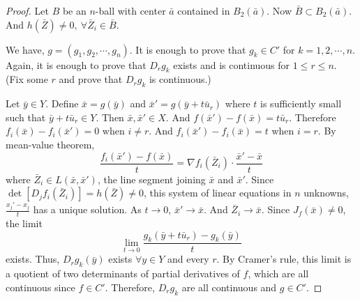 \begin{proof}
Let $B$ be an $n$-ball with center $\bar{a}$ contained in $B_2(\bar{a})$.
Now $\bar{B} \subset B_2(\bar{a})$.
And $h(\bar{Z}) \ne 0,\ \forall \bar{Z}_i \in \bar{B}$.

We have, $g = (g_1, g_2, \cdots,g_n)$.
It is enough to prove that $g_k \in C'$ for $k=1,2,\cdots,n$.
Again, it is enough to prove that $D_rg_k$ exists and is continuous for $1 \le r \le n$.
(Fix some $r$ and prove that $D_rg_k$ is continuous.)

Let $\bar{y} \in Y$.
Define $\bar{x} = g(\bar{y})$ and $\bar{x}' = g(\bar{y}+t\bar{u}_r)$ where $t$ is sufficiently small such that $\bar{y}+t\bar{u}_r \in Y$.
Then $\bar{x},\bar{x}' \in X$.
And $f(\bar{x}')-f(\bar{x}) = t\bar{u}_r$.
Therefore $f_i(\bar{x})-f_i(\bar{x}') = 0$ when $i \ne r$.
And $f_i(\bar{x}')-f_i(\bar{x}) = t$ when $i = r$.
By mean-value theorem,
$$\frac{f_i(\bar{x}') - f(\bar{x})}{t} = \nabla f_i(\bar{Z}_i) \cdot \frac{\bar{x}'-\bar{x}}{t}$$
where $\bar{Z}_i \in L(\bar{x},\bar{x}')$, the line segment joining $\bar{x}$ and $\bar{x}'$.
Since $\det[D_jf_i(\bar{Z}_i)] = h(\bar{Z}) \ne 0$, this system of linear equations in $n$ unknowns, $\frac{x_j'-x_j}{t}$ has a unique solution.
As $t \to 0$, $\bar{x}' \to \bar{x}$.
And $\bar{Z}_i \to \bar{x}$.
Since $J_f(\bar{x}) \ne 0$, the limit
$$ \lim_{t \to 0} \frac{g_k(\bar{y}+t\bar{u}_r)-g_k(\bar{y})}{t}$$
exists.
Thus, $D_rg_k(\bar{y})$ exists $\forall y \in Y$ and every $r$.	
By Cramer's rule, this limit is a quotient of two determinants of partial derivatives of $f$, which are all continuous since $f \in C'$.
Therefore, $D_rg_k$ are all continuous and $g \in C'$.
\end{proof}

